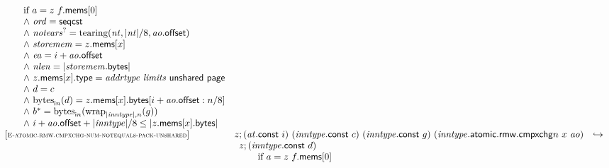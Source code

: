 $$\begin{array}[t]{@{}lrcl@{}l@{}}
{\begin{array}[t]{@{}l@{}l@{}l@{}}
 \multicolumn{3}{@{}l@{}}{\quad
\begin{array}[t]{@{}l@{}}
\quad
\begin{array}[t]{@{}l@{}}
\mbox{if}~ a = z~f{.}\mathsf{mems}{}[0] \\
{\land}~ {\mathit{ord}} = \mathsf{seqcst} \\
{\land}~ {{\mathit{notears}}^?} = {\mathrm{tearing}}({\mathit{nt}}, {|{\mathit{nt}}|} / 8, {\mathit{ao}}{.}\mathsf{offset}) \\
{\land}~ {\mathit{storemem}} = z{.}\mathsf{mems}{}[x] \\
{\land}~ {\mathit{ea}} = i + {\mathit{ao}}{.}\mathsf{offset} \\
{\land}~ {\mathit{nlen}} = {|{\mathit{storemem}}{.}\mathsf{bytes}|} \\
{\land}~ z{.}\mathsf{mems}{}[x]{.}\mathsf{type} = {\mathit{addrtype}}~{\mathit{limits}}~\mathsf{unshared}~\mathsf{page} \\
{\land}~ d = c \\
{\land}~ {{\mathrm{bytes}}}_{{\mathsf{i}}{n}}(d) = z{.}\mathsf{mems}{}[x]{.}\mathsf{bytes}{}[i + {\mathit{ao}}{.}\mathsf{offset} : n / 8] \\
{\land}~ {b^\ast} = {{\mathrm{bytes}}}_{{\mathsf{i}}{n}}({{\mathrm{wrap}}}_{{|{\mathit{inntype}}|}, n}(g)) \\
{\land}~ i + {\mathit{ao}}{.}\mathsf{offset} + {|{\mathit{inntype}}|} / 8 \leq {|z{.}\mathsf{mems}{}[x]{.}\mathsf{bytes}|} \\
\end{array} \\
\end{array}
} \\
\end{array}
} \\
{[\textsc{\scriptsize E{-}atomic.rmw.cmpxchg{-}num{-}notequals{-}pack{-}unshared}]} \quad & z ; ({\mathit{at}}{.}\mathsf{const}~i)~({\mathit{inntype}}{.}\mathsf{const}~c)~({\mathit{inntype}}{.}\mathsf{const}~g)~({{\mathit{inntype}}{.}\mathsf{atomic}{.}\mathsf{rmw}{.}\mathsf{cmpxchg}}{n}~x~{\mathit{ao}}) & \hookrightarrow & & \\
& \multicolumn{4}{@{}l@{}}{\quad
\begin{array}[t]{@{}l@{}l@{}l@{}}
z ; ({\mathit{inntype}}{.}\mathsf{const}~d) & & \\
 \multicolumn{3}{@{}l@{}}{\quad
\begin{array}[t]{@{}l@{}}
\quad
\begin{array}[t]{@{}l@{}}
\mbox{if}~ a = z~f{.}\mathsf{mems}{}[0] \\

\end{array}
\end{array}}
\end{array}}
\end{array}$$
